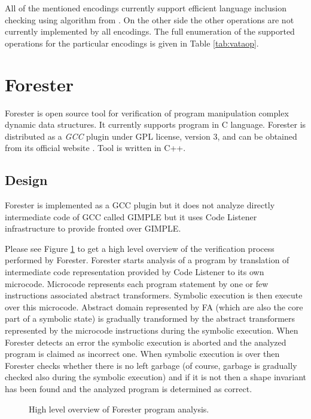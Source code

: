 All of the mentioned encodings currently support efficient language inclusion checking using algorithm
from \cite{tacas10}.
On the other side the other operations are not currently implemented by all encodings.
The full enumeration of the supported operations for the particular encodings is given in Table \ref{tab:vataop}.



\section{Forester}
\label{sec:FA}

Forester is open source tool for verification of program manipulation complex dynamic data structures.
It currently supports program in C language.
Forester is distributed as a \emph{GCC} plugin under GPL license, version 3, and can be obtained from its official website \cite{www:forester}.
Tool is written in C++.

\subsection{Design}

Forester is implemented as a GCC plugin but it does not analyze directly intermediate code of GCC called GIMPLE but it
uses Code Listener infrastructure \cite{cl11} to provide fronted over GIMPLE.

Please see Figure \ref{fig:fa_exec} to get a high level overview of the verification process performed by Forester. 
Forester starts analysis of a program by translation of intermediate code representation provided by Code Listener
to its own microcode.
Microcode represents each program statement by one or few instructions associated abstract transformers.
Symbolic execution is then execute over this microcode.
Abstract domain represented by FA (which are also the core part of a symbolic state) is gradually transformed by the abstract transformers
represented by the microcode instructions during the symbolic execution.
When Forester detects an error the symbolic execution is aborted and the analyzed program is claimed as incorrect one.
When symbolic execution is over then Forester checks whether there is no left garbage (of course, garbage is gradually checked also during the symbolic execution)
and if it is not then a shape invariant has been found and the analyzed program is determined as correct.

\begin{figure}[bt]
	\begin{center}
		
	\end{center}
	\caption{High level overview of Forester program analysis.}
	\label{fig:fa_exec}
\end{figure}

